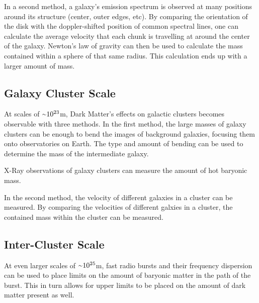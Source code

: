 In a second method, a galaxy's emission spectrum is observed at many positions around its structure (center, outer edges, etc).
By comparing the orientation of the disk with the doppler-shifted position of common spectral lines, one can calculate the average velocity that each chunk is travelling at around the center of the galaxy.
Newton's law of gravity can then be used to calculate the mass contained within a sphere of that same radius.
This calculation ends up with a larger amount of mass.

\subsection{Galaxy Cluster Scale}
%
At scales of $\nicetilde 10^{23}$m, Dark Matter's effects on galactic clusters becomes observable with three methods.
In the first method, the large masses of galaxy clusters can be enough to bend the images of background galaxies, focusing them onto observatories on Earth.
The type and amount of bending can be used to determine the mass of the intermediate galaxy.

X-Ray observations of galaxy clusters can measure the amount of hot baryonic mass.

In the second method, the velocity of different galaxies in a cluster can be measured.
By comparing the velocities of different galxies in a cluster, the contained mass within the cluster can be measured.

\subsection{Inter-Cluster Scale}
At even larger scales of $\nicetilde 10^{25}$m, fast radio bursts and their frequency dispersion can be used to place limits on the amount of baryonic matter in the path of the burst.
This in turn allows for upper limits to be placed on the amount of dark matter present as well.


